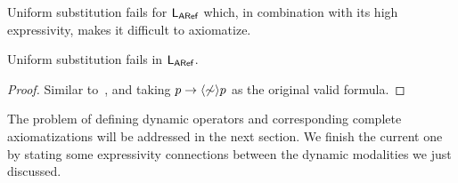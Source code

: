\medskip

Uniform substitution fails for $\mathsf{L_{ARef}}$ which, in combination with its high expressivity, makes it difficult to axiomatize.

\medskip

\begin{proposition}\label{prop:substitution-aref}
    Uniform substitution fails in $\mathsf{L_{ARef}}$.
\end{proposition}

\begin{proof}
Similar to~, and taking $p\to\langle \not\sim \rangle p$ as the original valid formula.
\end{proof}

The problem of defining dynamic operators and corresponding complete axiomatizations will be addressed in the next section. 
We finish the current one by stating some expressivity connections between the
dynamic modalities we just discussed.

\medskip

